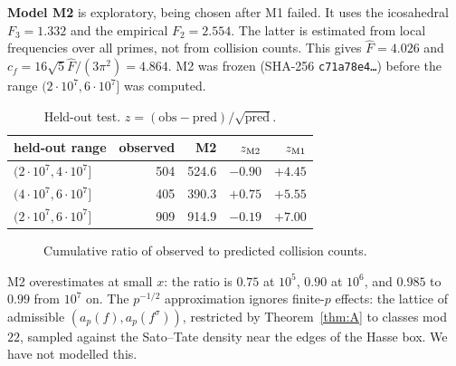 \documentclass[11pt]{amsart}
\theoremstyle{definition}
\theoremstyle{remark}
\begin{document}
\textbf{Model M2} is exploratory, being chosen after M1 failed. It uses the icosahedral $F_3=1.332$ and the empirical $F_2=2.554$. The latter is estimated from local frequencies over all primes, not from collision counts. This gives $\widehat F=4.026$ and $c_f=16\sqrt5\widehat F/(3\pi^2)=4.864$. M2 was frozen (SHA-256 \texttt{c71a78e4\ldots}) before the range $(2\cdot10^7,6\cdot10^7]$ was computed.

\begin{table}[ht]
\centering
\begin{tabular}{@{}lrrrr@{}}
\toprule
held-out range & observed & M2 & $z_{\rm M2}$ & $z_{\rm M1}$\\
\midrule
$(2\cdot10^7,4\cdot10^7]$ & 504 & 524.6 & $-0.90$ & $+4.45$\\
$(4\cdot10^7,6\cdot10^7]$ & 405 & 390.3 & $+0.75$ & $+5.55$\\
$(2\cdot10^7,6\cdot10^7]$ & 909 & 914.9 & $-0.19$ & $+7.00$\\
\bottomrule
\end{tabular}
\caption{Held-out test. $z=(\text{obs}-\text{pred})/\sqrt{\text{pred}}$.}
\end{table}

\begin{figure}[ht]
\centering
{}
\caption{Cumulative ratio of observed to predicted collision counts.}
\end{figure}

M2 overestimates at small $x$: the ratio is $0.75$ at $10^5$, $0.90$ at $10^6$, and $0.985$ to $0.99$ from $10^7$ on. The $p^{-1/2}$ approximation ignores finite-$p$ effects: the lattice of admissible $(a_p(f),a_p(f^\sigma))$, restricted by Theorem~\ref{thm:A} to classes mod $22$, sampled against the Sato--Tate density near the edges of the Hasse box. We have not modelled this.
\end{document}

